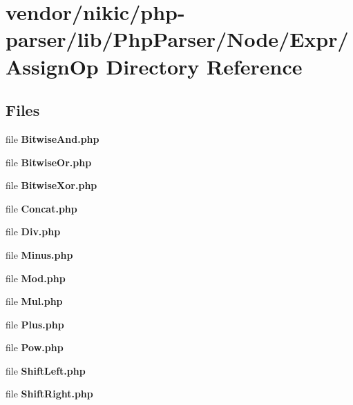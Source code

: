 \section{vendor/nikic/php-\/parser/lib/\+Php\+Parser/\+Node/\+Expr/\+Assign\+Op Directory Reference}
\label{dir_0497a92c4a12433845a32e4e51130fad}
\subsection*{Files}
\begin{DoxyCompactItemize}
\item 
file {\bf Bitwise\+And.\+php}
\item 
file {\bf Bitwise\+Or.\+php}
\item 
file {\bf Bitwise\+Xor.\+php}
\item 
file {\bf Concat.\+php}
\item 
file {\bf Div.\+php}
\item 
file {\bf Minus.\+php}
\item 
file {\bf Mod.\+php}
\item 
file {\bf Mul.\+php}
\item 
file {\bf Plus.\+php}
\item 
file {\bf Pow.\+php}
\item 
file {\bf Shift\+Left.\+php}
\item 
file {\bf Shift\+Right.\+php}
\end{DoxyCompactItemize}
